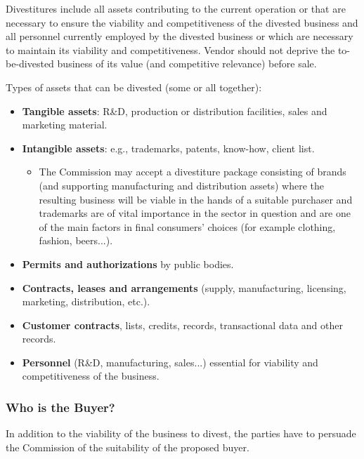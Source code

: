             Divestitures include all assets contributing to the current operation or that are necessary to ensure the viability and competitiveness of the divested business and all personnel currently employed by the divested business or which are necessary to maintain its viability and competitiveness. Vendor should not deprive the to-be-divested business of its value (and competitive relevance) before sale.

            Types of assets that can be divested (some or all together):
            \begin{itemize}
                \item \textbf{Tangible assets}: R\&D, production or distribution facilities, sales and marketing material.
                \item \textbf{Intangible assets}: e.g., trademarks, patents, know-how, client list.
                \begin{itemize}
                    \item The Commission may accept a divestiture package consisting of brands (and supporting manufacturing and distribution assets) where the resulting business will be viable in the hands of a suitable purchaser and trademarks are of vital importance in the sector in question and are one of the main factors in final consumers’ choices (for example clothing, fashion, beers...).
                \end{itemize}
                \item \textbf{Permits and authorizations} by public bodies.
                \item \textbf{Contracts, leases and arrangements} (supply, manufacturing, licensing, marketing, distribution, etc.).
                \item \textbf{Customer contracts}, lists, credits, records, transactional data and other records.
                \item \textbf{Personnel} (R\&D, manufacturing, sales...) essential for viability and competitiveness of the business.
            \end{itemize}

        \subsubsection{Who is the Buyer?}

        In addition to the viability of the business to divest, the parties have to persuade the Commission of the suitability of the proposed buyer.

